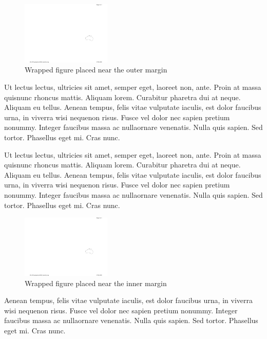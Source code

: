 \begin{figure}
  \centering 
  \includegraphics[width=0.38\textwidth]{Graphics/introaustralia}
  \caption{Wrapped figure placed near the outer margin}
  \label{fig:wrap-outer}
\end{figure}

Ut lectus lectus, ultricies sit amet, semper eget, laoreet non, ante. Proin at massa quisnunc rhoncus mattis. Aliquam lorem. Curabitur pharetra dui at neque. Aliquam eu tellus. Aenean tempus, felis vitae vulputate iaculis, est dolor faucibus urna, in viverra wisi nequenon risus. Fusce vel dolor nec sapien pretium nonummy. Integer faucibus massa ac nullaornare venenatis. Nulla quis sapien. Sed tortor. Phasellus eget mi. Cras nunc.

Ut lectus lectus, ultricies sit amet, semper eget, laoreet non, ante. Proin at massa quisnunc rhoncus mattis. Aliquam lorem. Curabitur pharetra dui at neque. Aliquam eu tellus. Aenean tempus, felis vitae vulputate iaculis, est dolor faucibus urna, in viverra wisi nequenon risus. Fusce vel dolor nec sapien pretium nonummy. Integer faucibus massa ac nullaornare venenatis. Nulla quis sapien. Sed tortor. Phasellus eget mi. Cras nunc.

\begin{figure}
  \centering 
  \includegraphics[width=0.38\textwidth]{Graphics/introaustralia}
  \caption{Wrapped figure placed near the inner margin}
  \label{fig:wrap-inner}
\end{figure}

Aenean tempus, felis vitae vulputate iaculis, est dolor faucibus urna, in viverra wisi nequenon risus. Fusce vel dolor nec sapien pretium nonummy. Integer faucibus massa ac nullaornare venenatis. Nulla quis sapien. Sed tortor. Phasellus eget mi. Cras nunc.

